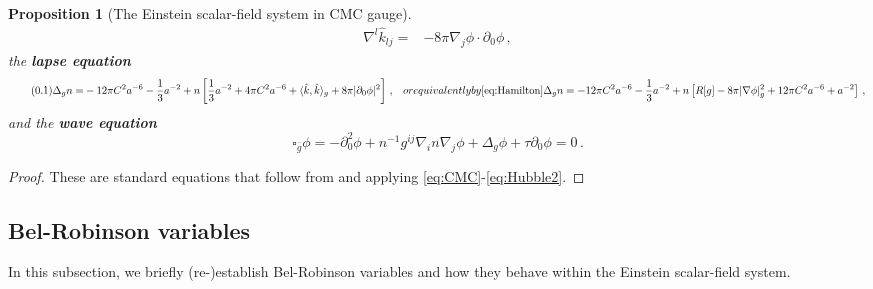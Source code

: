 \documentclass[11pt,leqno,textwidth=10cm]{amsart}
\numberwithin{equation}{section}
\theoremstyle{definition}
\theoremstyle{plain}
\newtheorem{prop}[definition]{Proposition}
\newcommand{\1}{\mathbbm{1}}
\newcommand{\g}{\overline{g}}
\newcommand{\Ric}{\text{\normalfont{Ric}}}
\newcommand{\del}{\partial}
\newcommand{\Lap}{\Delta}
\newcommand{\numberthis}{\addtocounter{equation}{1}\tag{\theequation}}
\renewcommand{\theequation}{\arabic{section}.\arabic{equation}}
\begin{document}
\begin{prop}[The Einstein scalar-field system in CMC gauge]
\begin{subequations}
\begin{align}
\nabla^l\hat{k}_{lj}=&-8\pi\nabla_j\phi\cdot \del_0\phi\,, \label{eq:Momentum}
\end{align}
\end{subequations}
the \textbf{lapse equation}
\begin{subequations}
\begin{align*}
\numberthis\label{eq:EEqLapse}\Lap_g n%
=&-12\pi C^2a^{-6}-\frac13a^{-2}+n\left[\frac13a^{-2}+4\pi C^2a^{-6}+\langle\hat{k},\hat{k}\rangle_g+8\pi\lvert \del_0\phi\rvert^2\right]\,,
\end{align*}
or equivalently by \eqref{eq:Hamilton}
\begin{equation}\label{eq:EEqLapse2}
\Lap_g n=-12\pi C^2a^{-6}-\frac13a^{-2}+n\left[R[g]-8\pi\lvert\nabla\phi\rvert_g^2+12\pi C^2a^{-6}+a^{-2}\right]\,,
\end{equation}
\end{subequations}
and the \textbf{wave equation}
\begin{equation}\label{eq:wave}
\square_{\g}\phi=-\del_0^2\phi+n^{-1}g^{ij}\nabla_in\nabla_j\phi+\Lap_g\phi+\tau \del_0\phi=0\,.
\end{equation}
\end{prop}
\begin{proof}
These are standard equations that follow from \cite[Chapter 2.3]{Rendall08} and applying \eqref{eq:CMC}-\eqref{eq:Hubble2}.
\end{proof}



\subsection{Bel-Robinson variables}\label{subsec:BR}
In this subsection, we briefly (re-)establish Bel-Robinson variables and how they behave within the Einstein scalar-field system.\\
\end{document}
